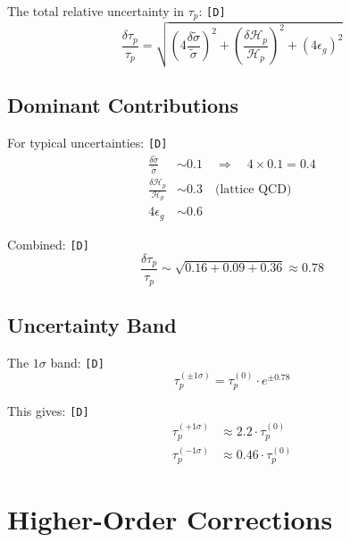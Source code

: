 \documentclass[11pt,a4paper]{article}
\newcommand{\tagD}{\textcolor{green!50!black}{\texttt{[D]}}}
\theoremstyle{definition}
\begin{document}
The total relative uncertainty in $\tau_p$: \tagD{}
\begin{equation}
\label{eq:app-unc-1}
\frac{\delta \tau_p}{\tau_p} = \sqrt{\left(4 \frac{\delta \tilde{\sigma}}{\tilde{\sigma}}\right)^2 + \left(\frac{\delta \mathcal{H}_p}{\mathcal{H}_p}\right)^2 + \left(4 \epsilon_g\right)^2}
\end{equation}

\subsection{Dominant Contributions}
\label{app:dominant}

For typical uncertainties: \tagD{}
\begin{align}
\label{eq:app-unc-2}
\frac{\delta \tilde{\sigma}}{\tilde{\sigma}} &\sim 0.1 \quad \Rightarrow \quad 4 \times 0.1 = 0.4 \\
\label{eq:app-unc-3}
\frac{\delta \mathcal{H}_p}{\mathcal{H}_p} &\sim 0.3 \quad \text{(lattice QCD)} \\
\label{eq:app-unc-4}
4\epsilon_g &\sim 0.6
\end{align}

Combined: \tagD{}
\begin{equation}
\label{eq:app-unc-5}
\frac{\delta \tau_p}{\tau_p} \sim \sqrt{0.16 + 0.09 + 0.36} \approx 0.78
\end{equation}

\subsection{Uncertainty Band}
\label{app:uncertainty-band}

The $1\sigma$ band: \tagD{}
\begin{equation}
\label{eq:app-unc-6}
\tau_p^{(\pm 1\sigma)} = \tau_p^{(0)} \cdot e^{\pm 0.78}
\end{equation}

This gives: \tagD{}
\begin{align}
\label{eq:app-unc-7}
\tau_p^{(+1\sigma)} &\approx 2.2 \cdot \tau_p^{(0)} \\
\label{eq:app-unc-8}
\tau_p^{(-1\sigma)} &\approx 0.46 \cdot \tau_p^{(0)}
\end{align}

\section{Higher-Order Corrections}
\label{app:higher-order}
\end{document}
